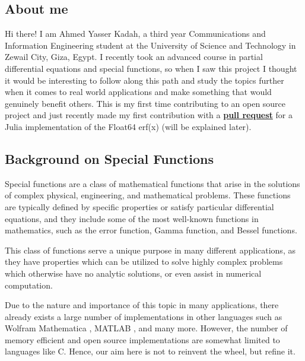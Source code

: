 \documentclass{article}
\theoremstyle{mytheoremstyle}
\theoremstyle{mytheoremstyle}
\theoremstyle{myproblemstyle}
\begin{document}
    \subsection*{About me 
      \href{https://github.com/AhmedYKadah}{\faGithub}    
      \href{https://linkedin.com/in/ahmed-yasser-kadah-83687b269}{\faLinkedin}    
      \href{mailto:ahmadyassermo@gmail.com}{\faEnvelope[regular]}    
    }\label{sub:About} 
      Hi there! I am Ahmed Yasser Kadah, a third year Communications and Information Engineering student at the University of Science and Technology in Zewail City, Giza, Egypt.
      I recently took an advanced course in partial differential equations and special functions, so when I saw this project I thought it would be interesting to follow along this path and study the topics further when it comes to real world applications and make something that would genuinely benefit others. 
      This is my first time contributing to an open source project and just recently made my first contribution with a \href{https://github.com/JuliaMath/SpecialFunctions.jl/pull/491}{\textbf{pull request}} for a Julia implementation of the Float64 erf(x) (will be explained later). 





    \subsection*{Background on Special Functions}\label{sub:Background } %
    Special functions are a class of mathematical functions that arise in the solutions of complex physical, engineering, and mathematical problems.\cite{special functions}
   These functions are typically defined by specific properties or satisfy particular differential equations, and they include some of the most well-known functions in mathematics, such as the error function, Gamma function, and Bessel functions.

   This class of functions serve a unique purpose in many different applications, as they have properties which can be utilized to solve highly complex problems which otherwise have no analytic solutions, or even assist in numerical computation.


   Due to the nature and importance of this topic in many applications, there already exists a large number of implementations in other languages such as Wolfram Mathematica \cite{wolfram special functions, wolfram hypergeometric}, MATLAB \cite{matlab special functions, matlab hypergeometric}, and many more.
    However, the number of memory efficient and open source implementations are somewhat limited to languages like C. 
    Hence, our aim here is not to reinvent the wheel, but refine it. 
\end{document}
